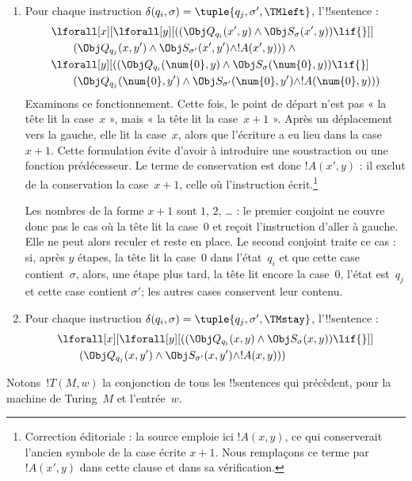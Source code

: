 \documentclass[../../../include/open-logic-section]{subfiles}
\begin{document}
\begin{enumerate}
\begin{enumerate}
\item {} Pour chaque instruction
  $\delta(q_i,\sigma)=\tuple{q_j,\sigma',\TMleft}$,
  l'!!{sentence} :
\begin{align*}
& \lforall[x][\lforall[y][(
  (\Obj Q_{q_i}(x',y)\land\Obj S_\sigma(x',y))\lif {}]]\\
&\qquad (\Obj Q_{q_j}(x,y')\land\Obj S_{\sigma'}(x',y')
  \land !A(x',y)))\land {}\\
& \lforall[y][(
  (\Obj Q_{q_i}(\num{0},y)\land\Obj S_\sigma(\num{0},y))\lif {}]\\
&\qquad (\Obj Q_{q_j}(\num{0},y')
  \land\Obj S_{\sigma'}(\num{0},y')
  \land !A(\num{0},y)))
\end{align*}
Examinons ce fonctionnement. Cette fois, le point de départ n'est
pas « la tête lit la case~$x$ », mais « la tête lit la case~$x+1$ ».
Après un déplacement vers la gauche, elle lit la case~$x$, alors
que l'écriture a eu lieu dans la case~$x+1$. Cette formulation évite
d'avoir à introduire une soustraction ou une fonction prédécesseur.
Le terme de conservation est donc $!A(x',y)$ : il exclut de la
conservation la case~$x+1$, celle où l'instruction écrit.\footnote{Correction éditoriale : la source emploie ici $!A(x,y)$, ce qui conserverait l'ancien symbole de la case écrite $x+1$. Nous remplaçons ce terme par $!A(x',y)$ dans cette clause et dans sa vérification.}

Les nombres de la forme $x+1$ sont $1$, $2$, \dots{} : le premier
conjoint ne couvre donc pas le cas où la tête lit la case~$0$ et
reçoit l'instruction d'aller à gauche. Elle ne peut alors reculer
et reste en place. Le second conjoint traite ce cas : si, après
$y$ étapes, la tête lit la case~$0$ dans l'état~$q_i$ et que cette
case contient~$\sigma$, alors, une étape plus tard, la tête lit
encore la case~$0$, l'état est~$q_j$ et cette case contient
$\sigma'$; les autres cases conservent leur contenu.

\item {} Pour chaque instruction
  $\delta(q_i,\sigma)=\tuple{q_j,\sigma',\TMstay}$,
  l'!!{sentence} :
\begin{align*}
& \lforall[x][\lforall[y][(
  (\Obj Q_{q_i}(x,y)\land\Obj S_\sigma(x,y))\lif {}]]\\
&\qquad (\Obj Q_{q_j}(x,y')\land\Obj S_{\sigma'}(x,y')
  \land !A(x,y)))
\end{align*}
\end{enumerate}
\end{enumerate}
Notons~$!T(M,w)$ la conjonction de tous les !!{sentence}s qui
précèdent, pour la machine de Turing~$M$ et l'entrée~$w$.
\end{document}
